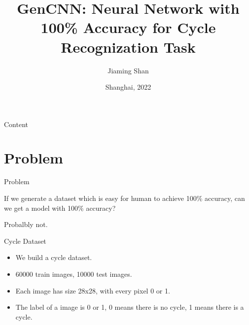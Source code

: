 \documentclass[serif]{beamer}
\begin{document}
\title[title]{GenCNN: Neural Network with 100\% Accuracy for Cycle Recognization Task}

\author[]{Jiaming Shan} %


\date[Date below]{Shanghai, 2022} %


\begin{frame}

	\thispagestyle{empty}%

	\titlepage

\end{frame}


\begin{frame}{Content}

	\tableofcontents %

\end{frame}


\section{Problem}

\begin{frame}{Problem}

	If we generate a dataset which is easy for human to achieve 100\% accuracy, can we get a model with 100\% accuracy?

	Probalbly not.

\end{frame}

\begin{frame}{Cycle Dataset}

	\begin{itemize}

		\item We build a cycle dataset.

		\item 60000 train images, 10000 test images.

		\item Each image has size 28x28, with every pixel 0 or 1.

		\item The label of a image is 0 or 1,
		      0 means there is no cycle, 1 means there is a cycle.

	\end{itemize}

\end{frame}
\end{document}

